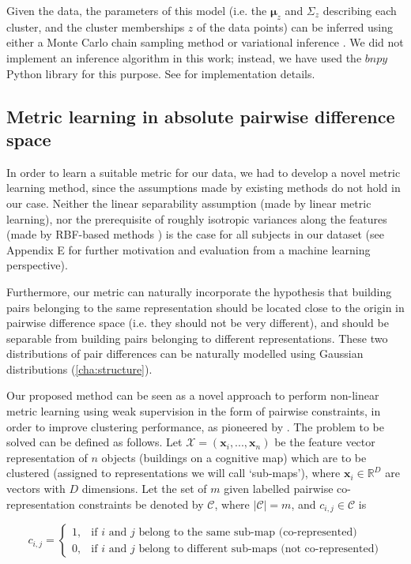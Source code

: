Given the data, the parameters of this model (i.e. the $\bm \mu_z$ and $\Sigma_z$ describing each cluster, and the cluster memberships $z$ of the data points) can be inferred using either a Monte Carlo chain sampling method \citep{neal2000markov} or variational inference \citep{blei2006variational}. We did not implement an inference algorithm in this work; instead, we have used the $bnpy$ Python library for this purpose. See \citep{hughes2013memoized} for implementation details.

\subsection{Metric learning in absolute pairwise difference space}

In order to learn a suitable metric for our data, we had to develop a novel metric learning method, since the assumptions made by existing methods do not hold in our case. Neither the linear separability assumption (made by linear metric learning), nor the prerequisite of roughly isotropic variances along the features (made by RBF-based methods \citep{ong2005learning}) is the case for all subjects in our dataset (see Appendix E for further motivation and evaluation from a machine learning perspective). 

Furthermore, our metric can naturally incorporate the hypothesis that building pairs belonging to the same representation should be located close to the origin in pairwise difference space (i.e. they should not be very different), and should be separable from building pairs belonging to different representations. These two distributions of pair differences can be naturally modelled using Gaussian distributions (\ref{cha:structure}). 

Our proposed method can be seen as a novel approach to perform non-linear metric learning using weak supervision in the form of pairwise constraints, in order to improve clustering performance, as pioneered by \cite{xing2002distance}. The problem to be solved can be defined as follows. Let $\mathcal{X}=(\bm x_i, ..., \bm x_n)$ be the feature vector representation of $n$ objects (buildings on a cognitive map) which are to be clustered (assigned to representations we will call `sub-maps'), where $\bm x_i \in \mathbb{R}^D$ are vectors with $D$ dimensions. Let the set of $m$ given labelled pairwise co-representation constraints be denoted by $\mathcal{C}$, where $ \lvert \mathcal{C} \lvert = m $, and $c_{i,j} \in \mathcal{C}$ is

\begin{equation}
c_{i,j}=
\begin{cases}
1, & \text{if $i$ and $j$ belong to the same sub-map (co-represented)} \\
0, & \text{if $i$ and $j$ belong to different sub-maps (not co-represented)}
\end{cases}
\end{equation}


